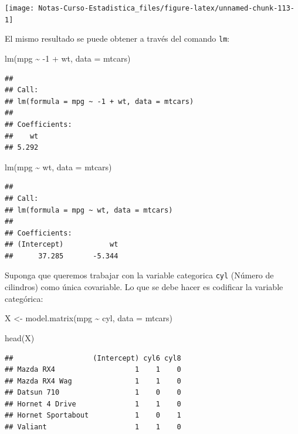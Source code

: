 \documentclass[
  12pt,
]{book}
\newenvironment{Shaded}{\begin{snugshade}}{\end{snugshade}}
\newcommand{\AttributeTok}[1]{\textcolor[rgb]{0.77,0.63,0.00}{#1}}
\newcommand{\DecValTok}[1]{\textcolor[rgb]{0.00,0.00,0.81}{#1}}
\newcommand{\FunctionTok}[1]{\textcolor[rgb]{0.00,0.00,0.00}{#1}}
\newcommand{\NormalTok}[1]{#1}
\newcommand{\OtherTok}[1]{\textcolor[rgb]{0.56,0.35,0.01}{#1}}
\newcommand{\SpecialCharTok}[1]{\textcolor[rgb]{0.00,0.00,0.00}{#1}}
\theoremstyle{definition}
\theoremstyle{definition}
\theoremstyle{definition}
\theoremstyle{definition}
\theoremstyle{remark}
\begin{document}
\begin{center}\texttt{[image: Notas-Curso-Estadistica\_files/figure-latex/unnamed-chunk-113-1]} \end{center}

El mismo resultado se puede obtener a través del comando \verb|lm|:

\begin{Shaded}
\begin{Highlighting}[]
\FunctionTok{lm}\NormalTok{(mpg }\SpecialCharTok{\textasciitilde{}} \SpecialCharTok{{-}}\DecValTok{1} \SpecialCharTok{+}\NormalTok{ wt, }\AttributeTok{data =}\NormalTok{ mtcars)}
\end{Highlighting}
\end{Shaded}

\begin{verbatim}
## 
## Call:
## lm(formula = mpg ~ -1 + wt, data = mtcars)
## 
## Coefficients:
##    wt  
## 5.292
\end{verbatim}

\begin{Shaded}
\begin{Highlighting}[]
\FunctionTok{lm}\NormalTok{(mpg }\SpecialCharTok{\textasciitilde{}}\NormalTok{ wt, }\AttributeTok{data =}\NormalTok{ mtcars)}
\end{Highlighting}
\end{Shaded}

\begin{verbatim}
## 
## Call:
## lm(formula = mpg ~ wt, data = mtcars)
## 
## Coefficients:
## (Intercept)           wt  
##      37.285       -5.344
\end{verbatim}

Suponga que queremos trabajar con la variable categorica \texttt{cyl} (Número de cilindros) como única covariable. Lo que se debe hacer es codificar la variable categórica:

\begin{Shaded}
\begin{Highlighting}[]
\NormalTok{X }\OtherTok{\textless{}{-}} \FunctionTok{model.matrix}\NormalTok{(mpg }\SpecialCharTok{\textasciitilde{}}\NormalTok{ cyl, }\AttributeTok{data =}\NormalTok{ mtcars)}

\FunctionTok{head}\NormalTok{(X)}
\end{Highlighting}
\end{Shaded}

\begin{verbatim}
##                   (Intercept) cyl6 cyl8
## Mazda RX4                   1    1    0
## Mazda RX4 Wag               1    1    0
## Datsun 710                  1    0    0
## Hornet 4 Drive              1    1    0
## Hornet Sportabout           1    0    1
## Valiant                     1    1    0
\end{verbatim}
\end{document}
